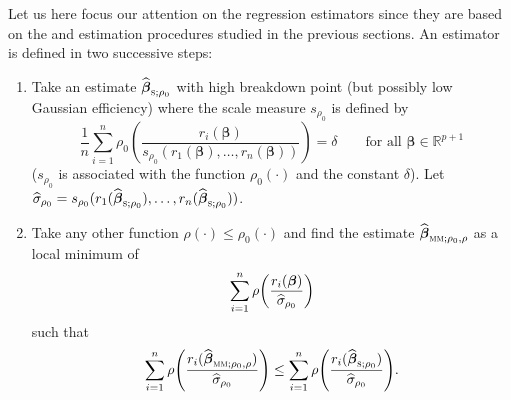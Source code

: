 Let us here focus our attention on the regression  estimators since
they are based on the  and  estimation procedures studied in
the previous sections. An  estimator is defined in two successive
steps:

\begin{enumerate}
    \item Take an  estimate $\sthat{\boldsymbol\beta}_{\stsc{S};\rho_{0}}$
    with high breakdown point (but possibly low Gaussian efficiency) where the scale
    measure $s_{\rho_{0}}$ is defined by
    \[
        \frac{1}{n} \sum_{i=1}^{n}\rho_{0}\left(\frac{r_{i}(\boldsymbol\beta)}
            {s_{\rho_{0}}(r_{1}(\boldsymbol\beta), \dots, r_{n}(\boldsymbol\beta))}\right) 
            = \delta
        \qquad\text{for all $\boldsymbol\beta\in\mathbb{R}^{p+1}$}
    \]
    ($s_{\rho_{0}}$ is associated with the function $\rho_{0}(\cdot)$ and the
    constant $\delta$). Let $\sthat{\sigma}_{\rho_{0}} =
    s_{\rho_{0}}(r_{1}(\sthat{\boldsymbol\beta}_{\stsc{S};\rho_{0}}),\allowbreak
    \dots,\allowbreak r_{n}(\sthat{\boldsymbol\beta}_{\stsc{S};\rho_{0}}))$.

    \item Take any other function $\rho(\cdot) \leq \rho_{0}(\cdot)$ and find
    the  estimate $\sthat{\boldsymbol\beta}_{\stsc{MM};\rho_{0},\rho}$
    as a local minimum of
    \begin{equation}\label{eq:MM_min}
        \sum_{i=1}^{n} \rho\left(\frac{r_{i}(\boldsymbol\beta)}{\sthat{\sigma}_{\rho_{0}}}\right)
    \end{equation}
    such that
    \begin{equation}\label{eq:MM_inequality}
        \sum_{i=1}^{n} \rho\left(\frac{r_{i}(\sthat{\boldsymbol\beta}_{\stsc{MM};\rho_{0},\rho})}
            {\sthat{\sigma}_{\rho_{0}}}\right)
     \leq \sum_{i=1}^{n}\rho\left(\frac{r_{i}(\sthat{\boldsymbol\beta}_{\stsc{S};\rho_{0}})}
         {\sthat{\sigma}_{\rho_{0}}}\right).
    \end{equation}
\end{enumerate}

